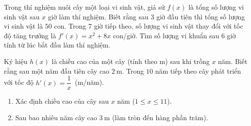 
\begin{bt}%
	Trong thí nghiệm nuôi cấy một loại vi sinh vật, giả sử $f(x)$ là tổng số lượng vi sinh vật sau $x$ giờ  làm thí nghiệm. Biết rằng sau $3$ giờ đầu tiên thì tổng số lượng vi sinh vật là $50$ con. Trong $7$ giờ tiếp theo, số lượng vi sinh vật thay đổi với tốc độ tăng trưởng là $f'(x)=x^2+8 x$ con/giờ. Tìm số lượng vi khuẩn sau $6$ giờ tính từ lúc bắt đầu làm thí nghiệm.
\end{bt}

\begin{bt}%
	Ký hiệu $h\left( x \right)$ là chiều cao của một cây (tính theo m) sau khi trồng $x$ năm. Biết rằng sau một năm đầu tiên cây cao $2~\mathrm{m} $. Trong $10$ năm tiếp theo cây phát triển với tốc độ ${h}'\left( x \right)=\dfrac{1}{x}\,$ (m/năm). 
	\begin{enumerate}
		\item Xác định chiều cao của cây sau $x$  năm ($1\le x\le 11$).
		\item Sau bao nhiêu năm cây cao $3~\mathrm{m} $ (làm tròn đến hàng phần trăm). 
	\end{enumerate}
\end{bt}

